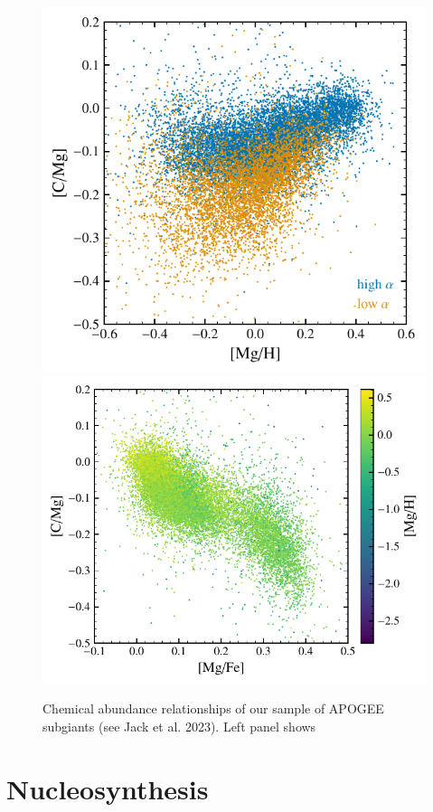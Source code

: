 \documentclass[fleqn,usenatbib]{mnras}
\begin{document}
\begin{figure}
    \centering
    \includegraphics[]{subgiants_mgh.pdf}
    \includegraphics[]{subgiants_mgfe.pdf}
    \caption{Chemical abundance relationships of our sample of APOGEE subgiants (see Jack et al. 2023). Left panel shows }
    \label{fig:sum}
\end{figure}
\section{Nucleosynthesis}
\end{document}

